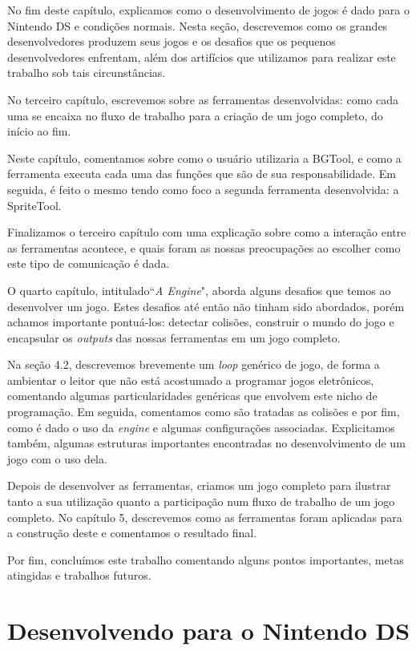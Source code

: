 \documentclass[brazil]{abnt}
\begin{document}
No fim  deste capítulo, explicamos como o desenvolvimento de jogos é dado para o Nintendo DS e condições normais. Nesta seção, descrevemos como os grandes desenvolvedores produzem seus jogos e os desafios que os pequenos desenvolvedores enfrentam, além dos artifícios que utilizamos para realizar este trabalho sob tais circunstâncias.

No terceiro capítulo, escrevemos sobre as ferramentas desenvolvidas: como cada uma se encaixa no fluxo de trabalho para a criação de um jogo completo, do início ao fim. 

Neste capítulo, comentamos sobre como o usuário utilizaria a BGTool, e como a ferramenta executa cada uma das funções que são de sua responsabilidade. Em seguida, é feito o mesmo tendo como foco a segunda ferramenta desenvolvida: a SpriteTool. 

Finalizamos o terceiro capítulo com uma explicação sobre como a interação entre as ferramentas acontece, e quais foram as nossas preocupações ao escolher como este tipo de comunicação é dada.

O quarto capítulo, intitulado``\textit{A Engine}", aborda alguns desafios que temos ao desenvolver um jogo. Estes desafios até então não tinham sido abordados, porém achamos importante pontuá-los: detectar colisões, construir o mundo do jogo e encapsular os \textit{outputs} das nossas ferramentas em um jogo completo.

Na seção 4.2, descrevemos brevemente um \textit{loop} genérico de jogo, de forma a ambientar o leitor que não está acostumado a programar jogos eletrônicos, comentando algumas particularidades genéricas que envolvem este nicho de programação. Em seguida, comentamos como são tratadas as colisões e por fim, como é dado o uso da \textit{engine} e  algumas configurações associadas. Explicitamos também, algumas estruturas importantes encontradas no desenvolvimento de um jogo com o uso dela.

Depois de desenvolver as ferramentas, criamos um jogo completo para ilustrar tanto a sua utilização quanto a participação num fluxo de trabalho de um jogo completo. No capítulo 5, descrevemos como as ferramentas foram aplicadas para a construção deste e comentamos o resultado final.

Por fim, concluímos este trabalho comentando alguns pontos importantes, metas atingidas e trabalhos futuros.

\chapter{Desenvolvendo para o Nintendo DS\label{cap:hardds}}
\end{document}
